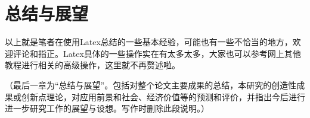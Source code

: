 \chapter{总结与展望}


以上就是笔者在使用Latex总结的一些基本经验，可能也有一些不恰当的地方，欢迎评论和指正。Latex具体的一些操作实在有太多太多，大家也可以参考网上其他教程进行相关的高级操作，这里就不再赘述啦。

（最后一章为“总结与展望”。包括对整个论文主要成果的总结，本研究的创造性成果或创新点理论，对应用前景和社会、经济价值等的预测和评价，并指出今后进行进一步研究工作的展望与设想。写作时删除此段说明。）



